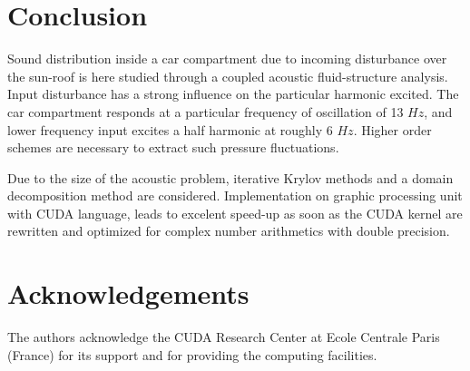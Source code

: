 \documentclass[10pt]{article}
\theoremstyle{plain}
\theoremstyle{definition}
\theoremstyle{remark}
\begin{document}
\section{Conclusion}

Sound distribution inside a car compartment due to incoming disturbance over the sun-roof is here studied through a coupled acoustic fluid-structure analysis.
Input disturbance has a strong influence on the particular harmonic excited.
The car compartment responds at a particular frequency of oscillation of 13 $Hz$, and lower frequency input excites a half harmonic at roughly 6 $Hz$.
Higher order schemes are necessary to extract such pressure fluctuations.

Due to the size of the acoustic problem, iterative Krylov methods and a domain decomposition method are considered.
Implementation on graphic processing unit with CUDA language, leads to excelent speed-up as soon as the CUDA kernel are rewritten and optimized for complex number arithmetics with double precision.


\section*{Acknowledgements}
The authors acknowledge the CUDA Research Center at Ecole Centrale Paris (France) for its support and for providing the computing facilities.




\end{document}
